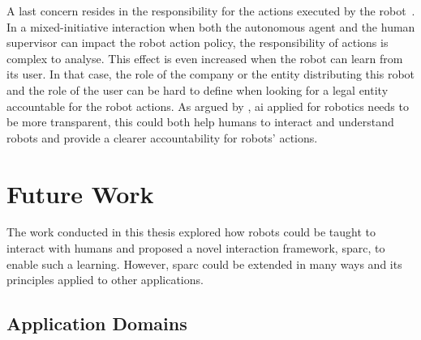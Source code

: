 A last concern resides in the responsibility for the actions executed by the robot~\citep{asaro2007robots}. In a mixed-initiative interaction when both the autonomous agent and the human supervisor can impact the robot action policy, the responsibility of actions is complex to analyse. This effect is even increased when the robot can learn from its user. In that case, the role of the company or the entity distributing this robot and the role of the user can be hard to define when looking for a legal entity accountable for the robot actions. As argued by \cite{wachter2017transparent}, \gls{ai} applied for robotics needs to be more transparent, this could both help humans to interact and understand robots and provide a clearer accountability for robots' actions.

\section{Future Work}


The work conducted in this thesis explored how robots could be taught to interact with humans and proposed a novel interaction framework, \gls{sparc}, to enable such a learning. However, \gls{sparc} could be extended in many ways and its principles applied to other applications.

\subsection{Application Domains}

